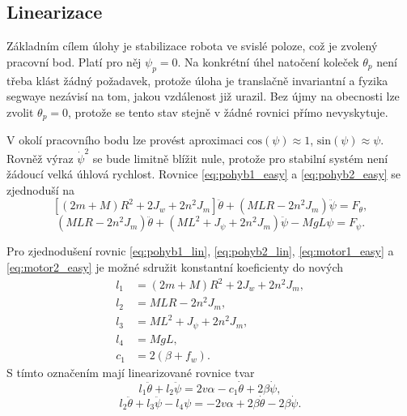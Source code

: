 \documentclass[conference]{IEEEtran}
\begin{document}
\subsection{Linearizace}
\label{sec:linearizace}

Základním cílem úlohy je stabilizace robota ve svislé poloze, což je zvolený pracovní bod.
Platí pro něj $\psi_p = 0$. Na konkrétní úhel natočení koleček $\theta_p$ není třeba klást žádný požadavek,
protože úloha je translačně invariantní a fyzika segwaye nezávisí na tom, jakou vzdálenost již urazil.
Bez újmy na obecnosti lze zvolit $\theta_p = 0$, protože se tento stav stejně v žádné rovnici přímo nevyskytuje.

V okolí pracovního bodu lze provést aproximaci $\text{cos}(\psi) \approx 1$, $\text{sin}(\psi) \approx \psi$. Rovněž výraz $\dot{\psi}^2$ se bude limitně blížit nule,
protože pro stabilní systém není žádoucí velká úhlová rychlost. Rovnice \eqref{eq:pohyb1_easy} a \eqref{eq:pohyb2_easy} se zjednoduší na
\begin{equation}
    \left[(2m + M) R^2 + 2 J_w + 2n^2 J_m\right] \ddot{\theta} + (MLR - 2n^2 J_m) \ddot{\psi} = F_\theta,
    \label{eq:pohyb1_lin}
\end{equation}
\begin{equation}
    (MLR - 2n^2 J_m) \ddot{\theta} + (ML^2 + J_\psi + 2n^2 J_m) \ddot{\psi} - MgL \psi = F_\psi.
    \label{eq:pohyb2_lin}
\end{equation}

Pro zjednodušení rovnic \eqref{eq:pohyb1_lin}, \eqref{eq:pohyb2_lin}, \eqref{eq:motor1_easy} a \eqref{eq:motor2_easy}
je možné sdružit konstantní koeficienty do nových 
\begin{equation}
    \begin{split}
        l_1 &= (2m + M) R^2 + 2 J_w + 2n^2 J_m, \\
        l_2 &= MLR - 2n^2 J_m, \\
        l_3 &= ML^2 + J_\psi + 2n^2 J_m, \\
        l_4 &= MgL, \\
        c_1 &= 2(\beta + f_w).
    \end{split}
\end{equation}
S tímto označením mají linearizované rovnice tvar
\begin{equation}
    l_1 \ddot{\theta} + l_2 \ddot{\psi} = 2v \alpha - c_1 \dot{\theta} + 2\beta\dot{\psi},
    \label{eq:pohyb1_lin_simple}
\end{equation}
\begin{equation}
    l_2 \ddot{\theta} + l_3 \ddot{\psi} - l_4 \psi = - 2v \alpha + 2\beta \dot{\theta} - 2\beta \dot{\psi}.
    \label{eq:pohyb2_lin_simple}
\end{equation}
\end{document}
